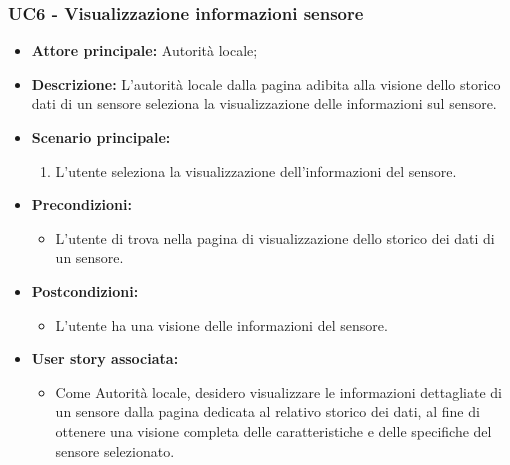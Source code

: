 \documentclass{article}
\begin{document}
\subsubsection{UC6 - Visualizzazione informazioni sensore}
\begin{itemize}
    \item \textbf{Attore principale:} Autorità locale;
    \item \textbf{Descrizione:} L’autorità locale dalla pagina adibita alla visione dello storico dati di un sensore seleziona la visualizzazione delle informazioni sul sensore.
    \item \textbf{Scenario principale:}
          \begin{enumerate}
              \item L'utente seleziona la visualizzazione dell'informazioni del sensore.
          \end{enumerate}
    \item \textbf{Precondizioni:}
          \begin{itemize}
              \item  L'utente di trova nella pagina di visualizzazione dello storico dei dati di un sensore.
          \end{itemize}
    \item \textbf{Postcondizioni:}
          \begin{itemize}
              \item  L'utente ha una visione delle informazioni del sensore.
          \end{itemize}
    \item \textbf{User story associata:}
          \begin{itemize}
              \item Come Autorità locale, desidero visualizzare le informazioni dettagliate di un sensore dalla pagina dedicata al relativo storico dei dati, al fine di ottenere una visione completa delle caratteristiche e delle specifiche del sensore selezionato.
          \end{itemize}
\end{itemize}

\end{document}
